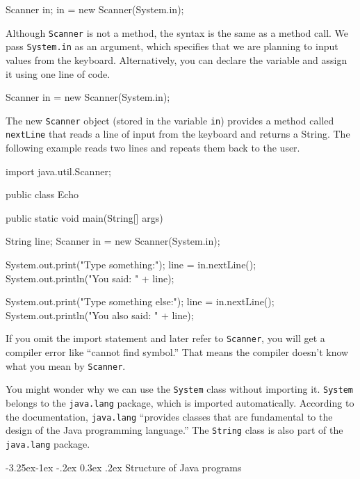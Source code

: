 \documentclass[12pt]{book}
\makeatletter
\renewcommand\subsection{\@startsection{subsection}{2}{\z@}%
    {-3.25ex\@plus -1ex \@minus -.2ex}%
    {0.3ex \@plus .2ex}%
    {\normalfont\large\bfseries}}
\theoremstyle{exercise}
\newcommand{\java}[1]{\lstinline{#1}} %
\makeatother
\begin{document}
\begin{code}
    Scanner in;
    in = new Scanner(System.in);
\end{code}


Although \java{Scanner} is not a method, the syntax is the same as a method call.
We pass \java{System.in} as an argument, which specifies that we are planning to input values from the keyboard.
Alternatively, you can declare the variable and assign it using one line of code.

\begin{code}
    Scanner in = new Scanner(System.in);
\end{code}

The new \java{Scanner} object (stored in the variable \java{in}) provides a method called \java{nextLine} that reads a line of input from the keyboard and returns a String.
The following example reads two lines and repeats them back to the user.

\begin{code}
import java.util.Scanner;

public class Echo {
    public static void main(String[] args) {
        String line;
        Scanner in = new Scanner(System.in);

        System.out.print("Type something:");
        line = in.nextLine();
        System.out.println("You said: " + line);

        System.out.print("Type something else:");
        line = in.nextLine();
        System.out.println("You also said: " + line);
    }
}
\end{code}

If you omit the import statement and later refer to \java{Scanner}, you will get a compiler error like ``cannot find symbol.''
That means the compiler doesn't know what you mean by \java{Scanner}.

You might wonder why we can use the \java{System} class without importing it.
\java{System} belongs to the \java{java.lang} package, which is imported automatically.
According to the documentation, \java{java.lang} ``provides classes that are fundamental to the design of the Java programming language.''
The \java{String} class is also part of the \java{java.lang} package.

\subsection{Structure of Java programs}
\label{sec:library}
\end{document}
